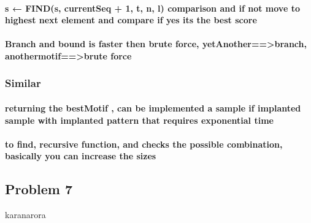 \documentclass[11pt]{article}
\begin{document}
\paragraph{s ← FIND(s, currentSeq + 1, t, n, l) comparison and if not
move to highest next element and compare if yes its the best
score}\label{s-finds-currentseq-1-t-n-l-comparison-and-if-not-move-to-highest-next-element-and-compare-if-yes-its-the-best-score}

\paragraph{Branch and bound is faster then brute force,
yetAnother==\textgreater{}branch, anothermotif==\textgreater{}brute
force}\label{branch-and-bound-is-faster-then-brute-force-yetanotherbranch-anothermotifbrute-force}

\subsubsection{Similar}\label{similar}

\paragraph{returning the bestMotif , can be implemented a sample if
implanted sample with implanted pattern that requires exponential
time}\label{returning-the-bestmotif-can-be-implemented-a-sample-if-implanted-sample-with-implanted-pattern-that-requires-exponential-time}

\paragraph{to find, recursive function, and checks the possible
combination, basically you can increase the
sizes}\label{to-find-recursive-function-and-checks-the-possible-combination-basically-you-can-increase-the-sizes}

    \subsection{Problem 7}\label{problem-7}

karanarora


    
    
    
    
\end{document}
